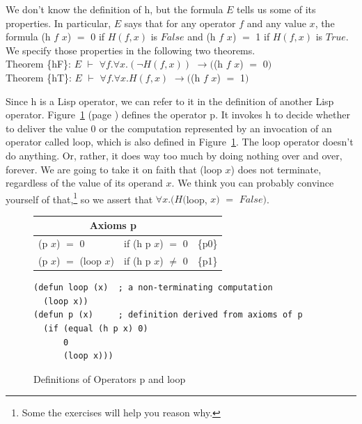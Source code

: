 We don't know the definition of \textsf{h}, but the formula $E$
tells us some of its properties.
In particular, $E$ says that for any operator $f$ and any value $x$,
the formula \textsf{(h $f$ $x$)} $=$ \textsf{0} if $H(f, x)$ is $False$ and
\textsf{(h $f$ $x$)} $=$ \textsf{1} if $H(f,x)$ is $True$.
We specify those properties in the following two theorems.
\vspace{2mm}\\
\hspace*{5mm}Theorem \{hF\}: $E$ $\vdash$ $\forall f.\forall x.(\neg H(f, x))$ $\rightarrow ($\textsf{(h $f$ $x$)} $=$ \textsf{0}$)$\\
\hspace*{5mm}Theorem \{hT\}: $E$ $\vdash$ $\forall f.\forall x.H(f, x)$      $\rightarrow ($\textsf{(h $f$ $x$)} $=$ \textsf{1}$)$
\vspace{2mm}

Since \textsf{h} is a Lisp operator, we can refer to it in the definition of
another Lisp operator.
Figure~\ref{fig:paradox-op-defun} (page \pageref{fig:paradox-op-defun})
defines the operator \textsf{p}.
It invokes \textsf{h} to decide whether to deliver the value \textsf{0} or
the computation represented by an invocation of an operator called \textsf{loop},
which is also defined in
Figure~\ref{fig:paradox-op-defun}.
The \textsf{loop} operator doesn't do anything. %
Or, rather,
it does way too much by doing nothing over and over, forever.
We are going to take it on faith that \textsf{(loop $x$)} does not terminate,
regardless of the value of its operand $x$.
We think you can probably convince yourself of that,\footnote{Some
the exercises will help you reason why.}
so we assert that $\forall x.(H($\textsf{loop}, $x)$ $=$ $False)$.

\begin{figure}
\begin{center}
\begin{tabular}{lll}
\multicolumn{2}{c}{Axioms \textsf{p}}\\
\hline
\textsf{(p $x$)} $=$ \textsf{0}          & if \textsf{(h p $x$)} $=$ \textsf{0}    &\{p0\}\\
\textsf{(p $x$)} $=$ \textsf{(loop $x$)} & if \textsf{(h p $x$)} $\neq$ \textsf{0} &\{p1\}\\
\end{tabular}
\begin{code}
\begin{verbatim}
(defun loop (x)  ; a non-terminating computation
  (loop x))
(defun p (x)     ; definition derived from axioms of p
  (if (equal (h p x) 0)
      0
      (loop x)))
\end{verbatim}
\end{code}
\end{center}
\caption{Definitions of Operators \textsf{p} and \textsf{loop}}
\label{fig:paradox-op-defun}
\end{figure}

